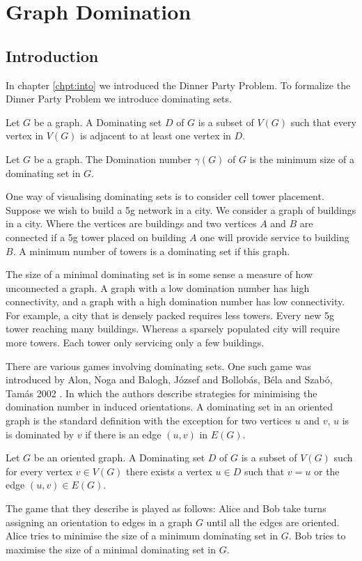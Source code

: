 \chapter{Graph Domination}\label{chpt:domSet}

\section{Introduction}

In chapter \ref{chpt:into} we introduced the Dinner Party Problem. To formalize the Dinner Party Problem we introduce dominating sets. 

\begin{definition}
    Let $G$ be a graph. A Dominating set $D$ of $G$ is a subset of $V(G)$ such that every vertex in $V(G)$ is adjacent to at least one vertex in $D$.
\end{definition} 
\begin{definition}
    Let $G$ be a graph. The Domination number $\gamma(G)$ of $G$ is the minimum size of a dominating set in $G$.
\end{definition}

One way of visualising dominating sets is to consider cell tower placement. Suppose we wish to build a 5g network in a city. We consider a graph of buildings in a city. Where the vertices are buildings and two vertices $A$ and $B$ are connected if a 5g tower placed on building $A$ one will provide service to building $B$. A minimum number of towers is a dominating set if this graph.

The size of a minimal dominating set is in some sense a measure of how unconnected a graph. A graph with a low domination number has high connectivity, and a graph with a high domination number has low connectivity. For example, a city that is densely packed requires less towers. Every new 5g tower reaching many buildings. Whereas a sparsely populated city will require more towers. Each tower only servicing only a few buildings.   

There are various games involving dominating sets. One such game was introduced by  Alon, Noga and Balogh, J\'{o}zsef and Bollob\'{a}s, B\'{e}la and Szab\'{o}, Tam\'{a}s 2002 \cite{AlBABoSz2002}. In which the authors describe strategies for minimising the domination number in induced orientations. A dominating set in an oriented graph is the standard definition with the exception for two vertices $u$ and $v$, $u$ is is dominated by $v$ if there is an edge $(u,v)$ in $E(G)$.
\begin{definition}
    Let $G$ be an oriented graph.  A Dominating set $D$ of $G$ is a subset of $V(G)$ such for every vertex $v\in V(G)$ there exists a vertex $u\in D$ such that $v=u$ or the edge $(u,v)\in E(G)$. 
\end{definition}
The game that they describe is played as follows: Alice and Bob take turns assigning an orientation to edges in a graph $G$ until all the edges are oriented. Alice tries to minimise the size of a minimum dominating set in $G$. Bob tries to maximise the size of a minimal dominating set in $G$.     

